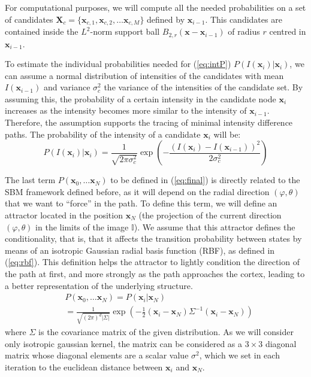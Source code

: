 For computational purposes, we will compute all the needed probabilities on a set of candidates $\mathbf{X}_c = \{\mathbf{x}_{c,1}, \mathbf{x}_{c,2}, \dots \mathbf{x}_{c,M} \}$ defined by $\mathbf{x}_{i-1}$. This candidates are contained inside the $L^2$-norm support ball $B_{2,r}(\mathbf{x}-\mathbf{x}_{i-1})$ of radius $r$ centred in $\mathbf{x}_{i-1}$.

To estimate the individual probabilities needed for (\ref{eq:intP}) $P (I(\mathbf{x}_i)|\mathbf{x}_i)$, we can assume a normal distribution of intensities of the candidates with mean $I(\mathbf{x}_{i-1})$ and variance $\sigma_c^2$ the variance of the intensities of the candidate set. By assuming this, the probability of a certain intensity in the candidate node $\mathbf{x}_i$ increases as the intensity becomes more similar to the intensity of $\mathbf{x}_{i-1}$. Therefore, the assumption supports the tracing of minimal intensity difference paths. The probability of the intensity of a candidate $\mathbf{x}_i$ will be: 
\begin{equation}\label{eq:intensity}
P(I(\mathbf{x}_i)|\mathbf{x}_i) =\frac{1}{\sqrt{2\pi \sigma_c^2}}\exp\left(-\frac{(I(\mathbf{x}_i)-I(\mathbf{x}_{i-1}))^2}{2\sigma_c^2}\right)
\end{equation}

The last term $P(\mathbf{x}_0, \dots \mathbf{x}_N)$ to be defined in (\ref{eq:final}) is directly related to the \ac{SBM} framework defined before, as it will depend on the radial direction $(\varphi, \theta)$ that we want to ``force'' in the path. To define this term, we will define an attractor located in the position $\mathbf{x}_N$ (the projection of the current direction $(\varphi,\theta)$ in the limits of the image $\mathbb{I}$). We assume that this attractor defines the conditionality, that is, that it affects the transition probability between states by means of an isotropic Gaussian radial basis function (RBF), as defined in (\ref{eq:rbf}). This definition helps the attractor to lightly condition the direction of the path at first, and more strongly as the path approaches the cortex, leading to a better representation of the underlying structure. 
\begin{align}\label{eq:rbf}
&P(\mathbf{x}_0, \dots \mathbf{x}_N) = P(\mathbf{x}_i|\mathbf{x}_N)  \\&= \frac{1}{\sqrt{(2\pi)^d|\Sigma|}} \exp\left(-\frac{1}{2}(\mathbf{x}_i-\mathbf{x}_N)\Sigma^{-1}(\mathbf{x}_i-\mathbf{x}_N)\right) 
\end{align}
where $\Sigma$ is the covariance matrix of the given distribution. As we will consider only isotropic gaussian kernel, the matrix can be considered as a $3\times3$ diagonal matrix whose diagonal elements are a scalar value $\sigma^2$, which we set in each iteration to the euclidean distance between $\mathbf{x}_i$ and $\mathbf{x}_N$. 

